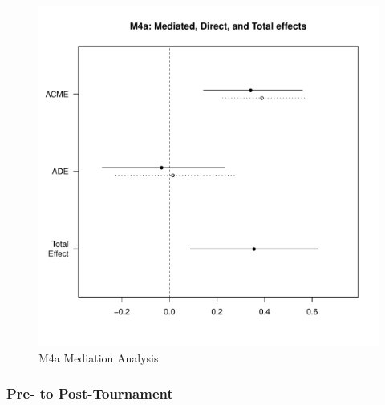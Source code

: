 {         \begin{figure}[htbp]
           \centering
           \includegraphics[scale = .5]{images/MLM4aMediationEffects.pdf}
           \caption{M4a Mediation Analysis}
           \label{fig:MLM4aMediationAnalysis}
         \end{figure}



      \subsubsection{Pre- to Post-Tournament}

}
